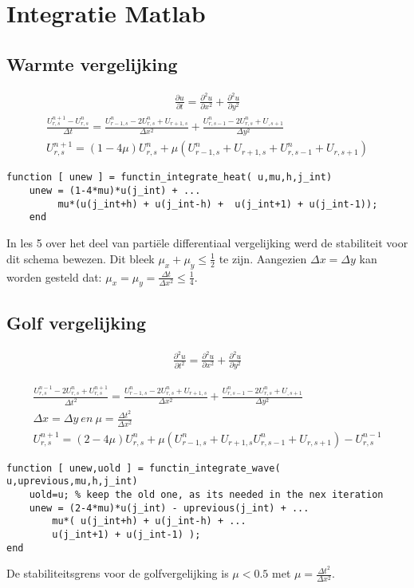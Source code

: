 \documentclass[11pt]{article} %
\begin{document}
\section{Integratie Matlab}

	\subsection{Warmte vergelijking}
		\begin{eqnarray}
			\frac{\partial u}{\partial t} = 
			\frac{\partial ^2 u}{\partial x^2} + 
			\frac{\partial ^2 u}{\partial  y^2} 	
		\end{eqnarray}
		\begin{eqnarray}
			\frac{U_{r,s}^{n+1} - U_{r,s}^n}{\Delta t} =
			\frac{U_{r-1,s}^n - 2 U_{r,s}^n + U_{r+1,s}}{\Delta x^2} + 
			\frac{U_{r,s-1}^n - 2 U_{r,s}^n + U_{,s+1} }{\Delta y^2} \\
			U_{r,s}^{n+1} =( 1-4\mu )U_{r,s}^n + \mu (U_{r-1,s}^n  + U_{r+1,s} + 
			U_{r,s-1}^n  + U_{r,s+1})
		\end{eqnarray}

\begin{lstlisting}[caption=Code Explicit Euler,label={lst:expl_euler}]
function [ unew ] = functin_integrate_heat( u,mu,h,j_int)
	unew = (1-4*mu)*u(j_int) + ... 
	     mu*(u(j_int+h) + u(j_int-h) +  u(j_int+1) + u(j_int-1));
	end
\end{lstlisting}
		In les 5 over het deel van partiële differentiaal vergelijking werd de stabiliteit voor dit schema bewezen. Dit bleek $\mu_x + \mu_y \leq \frac{1}{2}$ te zijn. Aangezien $\Delta x = \Delta y$ kan worden gesteld dat: $\mu_x = \mu_y =\frac{\Delta t}{\Delta x^2} \leq \frac{1}{4}$.
		
	\subsection{Golf vergelijking}
		\begin{eqnarray}
		\frac{\partial^2 u}{\partial t^2} = 
		\frac{\partial ^2 u}{\partial x^2} + 
		\frac{\partial ^2 u}{\partial  y^2} 	
		\end{eqnarray}

		\begin{eqnarray}
			\frac{U_{r,s}^{n-1} - 2U_{r,s}^{n}+U_{r,s}^{n+1} }{\Delta t^2} 
			=
			\frac{U_{r-1,s}^n - 2 U_{r,s}^n + U_{r+1,s}}{\Delta x^2} + 
			\frac{U_{r,s-1}^n - 2 U_{r,s}^n + U_{,s+1} }{\Delta y^2} \\
			\Delta x = \Delta y  \ en \  \mu=\frac{\Delta t^2}{\Delta x^2} \\
			U_{r,s}^{n+1} = ( 2-4\mu )U_{r,s}^n + \mu (U_{r-1,s}^n  + U_{r+1,s}
			U_{r,s-1}^n  + U_{r,s+1}) - U_{r,s}^{n-1}
		\end{eqnarray}
\begin{lstlisting}[caption=Code Explicit Euler,label={lst:expl_euler}]
function [ unew,uold ] = functin_integrate_wave( u,uprevious,mu,h,j_int)
	uold=u; % keep the old one, as its needed in the nex iteration
	unew = (2-4*mu)*u(j_int) - uprevious(j_int) + ...
		mu*( u(j_int+h) + u(j_int-h) + ...
		u(j_int+1) + u(j_int-1) );
end
\end{lstlisting}
De stabiliteitsgrens voor de golfvergelijking is $\mu < 0.5 $ met $\mu=\frac{\Delta t^2}{\Delta x^2}$.  
\end{document}
